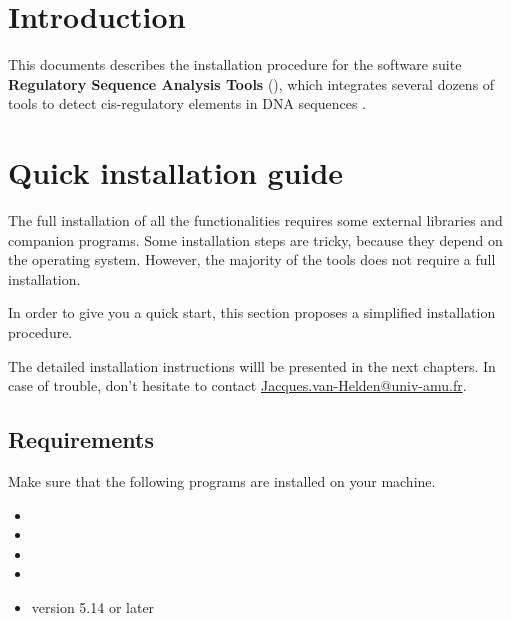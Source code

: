 \documentclass[12pt,a4paper, oneside]{scrreprt} %
\begin{document}


\newpage
\tableofcontents
\newpage

\chapter{Introduction}

This documents describes the installation procedure for the software
suite \textbf{Regulatory Sequence Analysis Tools} (\RSAT), which
integrates several dozens of tools to detect cis-regulatory elements
in DNA sequences
\cite{Thomas-Chollier:2011:W86-91,Thomas-Chollier:2008:W119-27,vanHelden:2003:3593-6,vanHelden:2000:177-87}.

\chapter{Quick installation guide}

The full installation of all the \RSAT functionalities requires some
external libraries and companion programs. Some installation steps are
tricky, because they depend on the operating system. However, the
majority of the tools does not require a full installation.

In order to give you a quick start, this section proposes a simplified
installation procedure.

The detailed installation instructions willl be presented in the next
chapters. In case of trouble, don't hesitate to contact
\href{mailto:me@example.com}{Jacques.van-Helden@univ-amu.fr}.

\section{Requirements}

Make sure that the following programs are installed on your machine.

\begin{itemize}
\item {}
\item {}
\item {}
\item {}
\item {} version 5.14 or later
\end{itemize}
\end{document}
